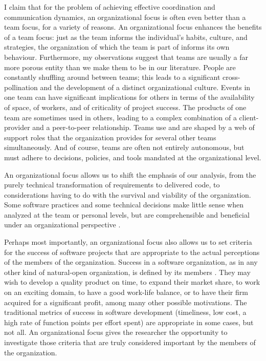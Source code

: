I claim that for the problem of achieving effective coordination and communication dynamics, an organizational focus is often even better than a team focus, for a variety of reasons. An organizational focus enhances the benefits of a team focus: just as the team informs the individual's habits, culture, and strategies, the organization of which the team is part of informs its own behaviour. Furthermore, my observations suggest that teams are usually a far more porous entity than we make them to be in our literature. People are constantly shuffling around between teams; this leads to a significant cross-pollination and the development of a distinct organizational culture. Events in one team can have significant implications for others in terms of the availability of space, of workers, and of criticality of project success. The products of one team are sometimes used in others, leading to a complex combination of a client-provider and a peer-to-peer relationship. Teams use and are shaped by a web of support roles that the organization provides for several other teams simultaneously. And of course, teams are often not entirely autonomous, but must adhere to decisions, policies, and tools mandated at the organizational level.

An organizational focus allows us to shift the emphasis of our analysis, from the purely technical transformation of requirements to delivered code, to considerations having to do with the survival and viability of the organization. Some software practices and some technical decisions make little sense when analyzed at the team or personal levels, but are comprehensible and beneficial under an organizational perspective \cite{Martin2007}.

Perhaps most importantly, an organizational focus also allows us to set criteria for the success of software projects that are appropriate to the actual perceptions of the members of the organization. Success in a software organization, as in any other kind of natural-open organization, is defined by its members \cite{Scott2007}. They may wish to develop a quality product on time, to expand their market share, to work on an exciting domain, to have a good work-life balance, or to have their firm acquired for a significant profit, among many other possible motivations. The traditional metrics of success in software development (timeliness, low cost, a high rate of function points per effort spent) are appropriate in some cases, but not all. An organizational focus gives the researcher the opportunity to investigate those criteria that are truly considered important by the members of the organization.


